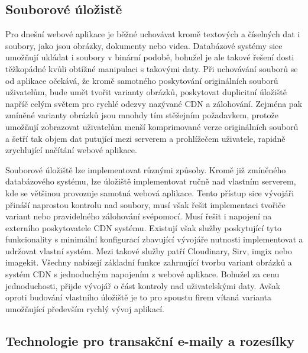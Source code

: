 	\subsection{Souborové úložistě}

	Pro dnešní webové aplikace je běžné uchovávat kromě textových a číselných dat i soubory, jako jsou
	obrázky, dokumenty nebo videa.
	Databázové systémy sice umožňují ukládat i soubory v binární podobě, bohužel je ale takové řešení dosti
	těžkopádné kvůli obtížné manipulaci s takovými daty.
	Při uchovávání souborů se od aplikace očekává, že kromě samotného poskytování originálních souborů uživatelům, bude umět tvořit
	varianty obrázků, poskytovat duplicitní úložiště napříč celým světem pro rychlé odezvy nazývané \noindent\Ac{CDN} a zálohování.
	Zejména pak zmíněné varianty obrázků jsou mnohdy tím stěžejním požadavkem, protože umožňují zobrazovat uživatelům menší
	komprimované verze originálních souborů a šetří tak objem dat putující mezi serverem a prohlížečem uživatele, rapidně
	zrychlující načítání webové aplikace.

	Souborové úložiště lze implementovat různými způsoby.
	Kromě již zmíněného databázového systému, lze úložiště implementovat ručně nad vlastním serverem, kde se většinou
	provozuje samotná webová aplikace.
	Tento přístup sice vývojáři přináší naprostou kontrolu nad soubory, musí však řešit implementaci tvořiče variant
	nebo pravidelného zálohování svépomocí.
	Musí řešit i napojení na externího poskytovatele \noindent\Ac{CDN} systému.
	Existují však služby poskytující tyto funkcionality s minimální konfigurací zbavující vývojáře nutnosti implementovat
	a udržovat vlastní systém.
	Mezi takové služby patří Cloudinary, Sirv, imgix nebo imagekit.
	Všechny nabízejí základní funkce zahrnující tvorbu variant obrázků a systém \Ac{CDN} s jednoduchým napojením
	z webové aplikace.
	Bohužel za cenu jednoduchosti, přijde vývojář o část kontroly nad uživatelskými daty.
	Avšak oproti budování vlastního úložiště je to pro spoustu firem vítaná varianta umožňující především rychlý vývoj
	aplikací.

	\subsection{Technologie pro transakční e-maily a rozesílky}

